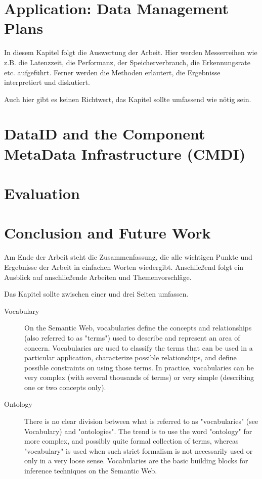 \documentclass[a4paper,english,twoside,BCOR1.5cm,headsepline,DIV12,appendixprefix,final,12pt]{scrbook}
\begin{document}
\chapter{Application: Data Management Plans}
\label{chap:pocdmp}

In diesem Kapitel folgt die Auswertung der Arbeit. Hier werden Messerreihen wie z.B. die Latenzzeit, die Performanz, der Speicherverbrauch, die Erkennungsrate etc. aufgeführt. Ferner werden die Methoden erläutert, die Ergebnisse interpretiert und diskutiert.

Auch hier gibt es keinen Richtwert, das Kapitel sollte umfassend wie nötig sein.

\chapter{DataID and the Component MetaData Infrastructure (CMDI)}
\label{chap:pocmap}

\chapter{Evaluation}
\label{chap:evaluation}

\chapter{Conclusion and Future Work}
\label{chap:future}
Am Ende der Arbeit steht die Zusammenfassung, die alle wichtigen Punkte und Ergebnisse der Arbeit in einfachen Worten wiedergibt. Anschließend folgt ein Ausblick auf anschließende Arbeiten und Themenvorschläge.

Das Kapitel sollte zwischen einer und drei Seiten umfassen.


\begin{description}
\item[Vocabulary] On the Semantic Web, vocabularies define the concepts and relationships (also referred to as "terms") used to describe and represent an area of concern. Vocabularies are used to classify the terms that can be used in a particular application, characterize possible relationships, and define possible constraints on using those terms. In practice, vocabularies can be very complex (with several thousands of terms) or very simple (describing one or two concepts only)\cite{W3CVOCONTO}.

\item[Ontology] There is no clear division between what is referred to as "vocabularies" (see Vocabulary) and "ontologies". The trend is to use the word "ontology" for more complex, and possibly quite formal collection of terms, whereas "vocabulary" is used when such strict formalism is not necessarily used or only in a very loose sense. Vocabularies are the basic building blocks for inference techniques on the Semantic Web\cite{W3CVOCONTO}.
\end{description}
\end{document}
